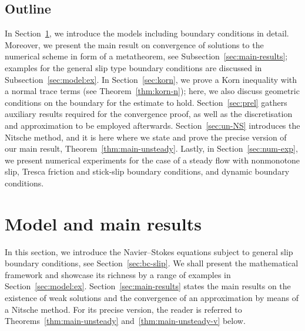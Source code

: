 \documentclass[reqno,a4paper]{amsart}
\begin{document}
	\subsection{Outline}
	In Section~\ref{sec:model-results}, we introduce the models including boundary conditions in detail. 
	Moreover, we present the main result on convergence of solutions to the numerical scheme in form of a metatheorem, see Subsection~\ref{sec:main-results}; examples for the general slip type boundary conditions are discussed in Subsection~\ref{sec:model:ex}. 
	In Section~\ref{sec:korn},  we prove a Korn inequality with a normal trace terms  (see Theorem~\ref{thm:korn-n}); here, we also discuss geometric conditions on the boundary for the estimate to hold. 
	Section~\ref{sec:prel} gathers auxiliary results required for the convergence proof,  as well as the discretisation and approximation to be employed afterwards. 
	Section~\ref{sec:un-NS} introduces the Nitsche method, and it is here where we state and prove the precise version of our main result, Theorem~\ref{thm:main-unsteady}. Lastly, in Section~\ref{sec:num-exp}, we present numerical experiments for the case of a steady flow with nonmonotone slip, Tresca friction and stick-slip boundary conditions, and dynamic boundary conditions. 
	
	\section{Model and main results}\label{sec:model-results}
	
	In this section, we introduce the Navier--Stokes equations subject to general slip boundary conditions, see Section~\ref{sec:bc-slip}. 
	We shall present the mathematical framework and showcase its richness by a range of examples in Section~\ref{sec:model:ex}. 
	Section~\ref{sec:main-results} states the main results on the existence of weak solutions and the convergence of an approximation by means of a Nitsche method. 
	For its precise version, the reader is referred to Theorems~\ref{thm:main-unsteady} and~\ref{thm:main-unsteady-v} below. 
	
\end{document}

